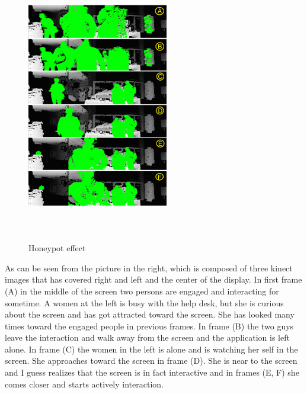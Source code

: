 \begin{figure}
  \vspace{-30pt}
  \begin{center}
    \includegraphics[width=0.55\textwidth,height=120mm]{Figures/9/effects/honeypot}
  \end{center}
  \vspace{-20pt}
  \caption{Honeypot effect}
  \vspace{-60pt}
\end{figure}
As can be seen from the picture in the right, which is composed of three kinect images that has covered right and left and the center of the display. 
In first frame (A) in the middle of the screen two persons are engaged and interacting for sometime. A women at the left is busy with the help desk, but she is curious about the screen and has got attracted toward the screen. She has looked many times toward the engaged people in previous frames. In frame (B) the two guys leave the interaction and walk away from the screen and the application is left alone. In frame (C) the women in the left is alone and is watching her self in the screen. She approaches toward the screen in frame (D). She is near to the screen and I guess realizes that the screen is in fact interactive and in frames (E, F) she comes closer and starts actively interaction.


 



